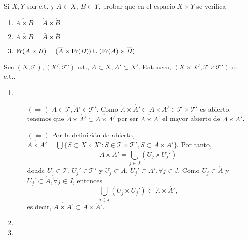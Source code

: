 \begin{ejr}[34]
  Si $X, Y$ son e.t. y $A \subset X$, $B \subset Y$, probar que en el espacio $X \times Y$ se verifica
  \begin{enumerate}[label=(\roman*)]
    \item $\mathring{A \times B} = \mathring{A} \times \mathring{B}$
    \item $\overline{A \times B} = \overline{A} \times \overline{B}$
    \item $\operatorname{Fr}({A \times B}) = (\overline{A} \times \operatorname{Fr}(B)) \cup (\operatorname{Fr}(A) \times \overline{B})$
  \end{enumerate}
\end{ejr}

\begin{sol}
Sea $( X, \mathcal{T} ), ( X', \mathcal{T}' )$ e.t., $A \subset X, A' \subset X'$. Entonces, $( X \times X', \mathcal{T} \times \mathcal{T}')$ es e.t..
  \begin{enumerate}[label=(\roman*)]
    \item \begin{enumerate}[label=(\roman*)]
      \item []
      \item [$(\Rightarrow)$] $\mathring{A} \in \mathcal{T}, \mathring{A}' \in \mathcal{T}'$. Como $\mathring{A} \times \mathring{A'} \subset A \times A' \in \mathcal{T} \times \mathcal{T}'$ es abierto, tenemos que $\mathring{A} \times \mathring{A'} \subset \mathring{A \times A'}$ por ser $\mathring{A \times A'}$ el mayor abierto de $A \times A'$.
      \item [$(\Leftarrow)$] Por la definición de abierto, $\mathring{A \times A'} = \bigcup \{ S \subset X \times X' : S \in \mathcal{T} \times \mathcal{T}', S \subset A \times A' \}$. Por tanto,
        \[
          \mathring{A \times A'} = \bigcup_{j \in J} (U_{j} \times U_{j}')
        \]
        donde $U_{j} \in \mathcal{T}$, $U_{j}' \in \mathcal{T}'$ y $U_{j} \subset A$, $U_{j}' \subset A', \forall j \in J$. Como $U_{j} \subset \mathring{A}$ y $U_{j}' \subset \mathring{A}, \forall j \in J$, entonces
        \[ 
          \bigcup_{j \in J} (U_{j} \times U_{j}') \subset \mathring{A} \times \mathring{A'},
        \] 
        es decir, $\mathring{A \times A'} \subset \mathring{A} \times \mathring{A}'$.
    \end{enumerate}
    \item 
    \item 
  \end{enumerate}
\end{sol}
